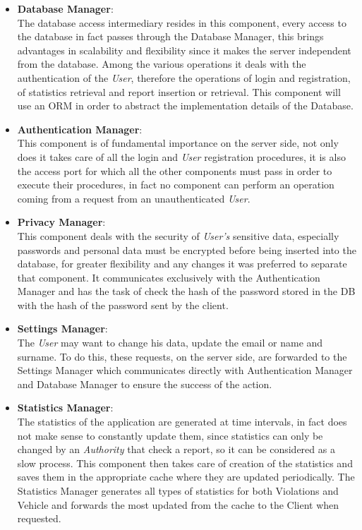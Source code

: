 \documentclass{article}
\begin{document}
\begin{itemize}

\item \textbf{Database Manager}: \\
The database access intermediary resides in this component, every access to the database in 
fact passes through the Database Manager, this brings advantages in scalability and flexibility 
since it makes the server independent from the database. Among the various operations it deals 
with the authentication of the \textit{User}, therefore the operations of login and registration, 
of statistics retrieval and report insertion or retrieval. This component will use an 
ORM in order to abstract the implementation details of the Database.

\item \textbf{Authentication Manager}: \\
This component is of fundamental importance on the server side, not only does it takes care 
of all the login and \textit{User} registration procedures, it is also the access port for which all 
the other components must pass in order to execute their procedures, in fact no component 
can perform an operation coming from a request from an unauthenticated \textit{User}.

\item \textbf{Privacy Manager}: \\
This component deals with the security of \textit{User's} sensitive data, especially passwords 
and personal data must be encrypted before being inserted into the database, for greater 
flexibility and any changes it was preferred to separate that component. 
It communicates exclusively with the Authentication Manager and has the task 
of check the hash of the password stored in the DB with the hash of the 
password sent by the client.

\item \textbf{Settings Manager}: \\
The \textit{User} may want to change his data, update the email or name and surname. To do this, these 
requests, on the server side, are forwarded to the Settings Manager which communicates directly 
with Authentication Manager and Database Manager to ensure the success of the action. 

\item \textbf{Statistics Manager}: \\
The statistics of the application are generated at time intervals, in fact does 
not make sense to constantly update them, since statistics can only be changed by an \textit{Authority} that
check a report, so it can be considered as a slow process. This component then takes care of creation 
of the statistics and saves them in the appropriate cache where they are updated periodically. 
The Statistics Manager generates all types of statistics for both Violations and Vehicle and 
forwards the most updated from the cache to the Client when requested.


\end{itemize}
\end{document}
